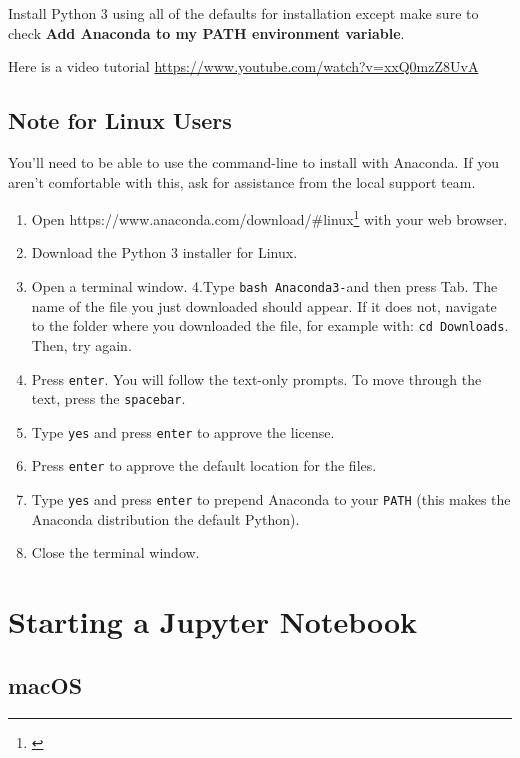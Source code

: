 \documentclass[]{book}
\providecommand{\tightlist}{%
  \setlength{\itemsep}{0pt}\setlength{\parskip}{0pt}}
\let\rmarkdownfootnote\footnote%
\def\footnote{\protect\rmarkdownfootnote}
\renewcommand{\href}[2]{#2\footnote{\url{#1}}}
\theoremstyle{definition}
\theoremstyle{definition}
\theoremstyle{definition}
\theoremstyle{remark}
\begin{document}
Install Python 3 using all of the defaults for installation except make
sure to check \textbf{Add Anaconda to my PATH environment variable}.

Here is a video tutorial
\url{https://www.youtube.com/watch?v=xxQ0mzZ8UvA}

\hypertarget{note-for-linux-users}{%
\subsection{Note for Linux Users}\label{note-for-linux-users}}

You'll need to be able to use the command-line to install with Anaconda.
If you aren't comfortable with this, ask for assistance from the local
support team.

\begin{enumerate}
\def\labelenumi{\arabic{enumi}.}
\tightlist
\item
  Open \href{}{https://www.anaconda.com/download/\#linux} with your web
  browser.
\item
  Download the Python 3 installer for Linux.
\item
  Open a terminal window. 4.Type \texttt{bash\ Anaconda3-}and then press
  Tab. The name of the file you just downloaded should appear. If it
  does not, navigate to the folder where you downloaded the file, for
  example with: \texttt{cd\ Downloads}. Then, try again.
\item
  Press \texttt{enter}. You will follow the text-only prompts. To move
  through the text, press the \texttt{spacebar}.
\item
  Type \texttt{yes} and press \texttt{enter} to approve the license.
\item
  Press \texttt{enter} to approve the default location for the files.
\item
  Type \texttt{yes} and press \texttt{enter} to prepend Anaconda to your
  \texttt{PATH} (this makes the Anaconda distribution the default
  Python).
\item
  Close the terminal window.
\end{enumerate}

\hypertarget{starting-a-jupyter-notebook}{%
\section{Starting a Jupyter
Notebook}\label{starting-a-jupyter-notebook}}

\hypertarget{macos}{%
\subsection{macOS}\label{macos}}
\end{document}
